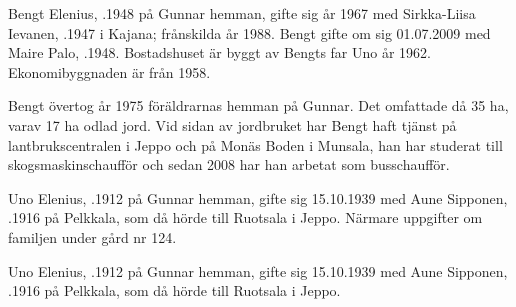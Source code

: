 


Bengt Elenius, .1948 på Gunnar hemman, gifte sig år 1967 med Sirkka-Liisa Ievanen, .1947 i Kajana; frånskilda år 1988. Bengt gifte om sig 01.07.2009 med Maire Palo, .1948. Bostadshuset är byggt av Bengts far Uno år 1962. Ekonomibyggnaden är från 1958.
\begin{jhchildren}
  \item {}
  \item {}
  \item {}
\end{jhchildren}

Bengt övertog år 1975 föräldrarnas hemman på Gunnar. Det omfattade då 35 ha, varav 17 ha odlad jord. Vid sidan av jordbruket har Bengt haft tjänst på lantbrukscentralen i Jeppo och på Monäs Boden i Munsala, han har studerat till skogsmaskinschaufför och sedan 2008 har han arbetat som busschaufför.


Uno Elenius, .1912 på Gunnar hemman, gifte sig 15.10.1939 med Aune Sipponen, .1916 på Pelkkala, som då hörde till Ruotsala i Jeppo. Närmare uppgifter om familjen under gård nr 124.




Uno Elenius, .1912 på Gunnar hemman, gifte sig 15.10.1939 med Aune Sipponen, .1916 på Pelkkala, som då hörde till Ruotsala i Jeppo.
\begin{jhchildren}
  \item {}
  \item {}
  \item {}
  \item {}
\end{jhchildren}

